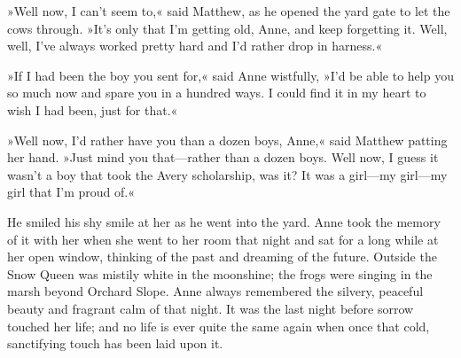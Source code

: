 »Well now, I can't seem to,« said Matthew, as he opened the yard gate to let the cows through. »It's only that I'm getting old, Anne, and keep forgetting it. Well, well, I've always worked pretty hard and I'd rather drop in harness.«

»If I had been the boy you sent for,« said Anne wistfully, »I'd be able to help you so much now and spare you in a hundred ways. I could find it in my heart to wish I had been, just for that.«

»Well now, I'd rather have you than a dozen boys, Anne,« said Matthew patting her hand. »Just mind you that—rather than a dozen boys. Well now, I guess it wasn't a boy that took the Avery scholarship, was it? It was a girl—my girl—my girl that I'm proud of.«

He smiled his shy smile at her as he went into the yard. Anne took the memory of it with her when she went to her room that night and sat for a long while at her open window, thinking of the past and dreaming of the future. Outside the Snow Queen was mistily white in the moonshine; the frogs were singing in the marsh beyond Orchard Slope. Anne always remembered the silvery, peaceful beauty and fragrant calm of that night. It was the last night before sorrow touched her life; and no life is ever quite the same again when once that cold, sanctifying touch has been laid upon it.